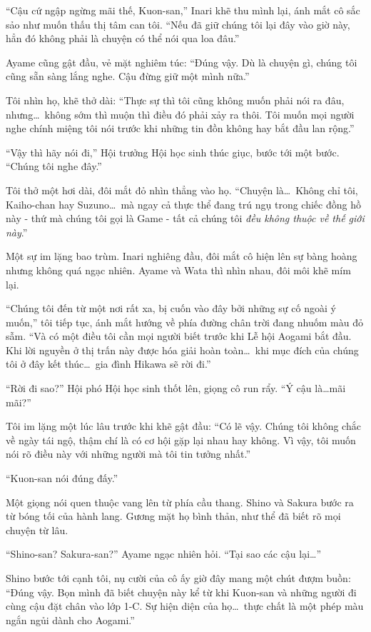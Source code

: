 \documentclass[../main.tex]{subfiles}
\begin{document}
``Cậu cứ ngập ngừng mãi thế, Kuon-san,'' Inari khẽ thu mình lại, ánh mắt cô sắc sảo như muốn thấu thị tâm can tôi. ``Nếu đã giữ chúng tôi lại đây vào giờ này, hẳn đó không phải là chuyện có thể nói qua loa đâu.''

Ayame cũng gật đầu, vẻ mặt nghiêm túc: ``Đúng vậy. Dù là chuyện gì, chúng tôi cũng sẵn sàng lắng nghe. Cậu đừng giữ một mình nữa.''

Tôi nhìn họ, khẽ thở dài: ``Thực sự thì tôi cũng không muốn phải nói ra đâu, nhưng\dots\ không sớm thì muộn thì điều đó phải xảy ra thôi. Tôi muốn mọi người nghe chính miệng tôi nói trước khi những tin đồn không hay bắt đầu lan rộng.''

``Vậy thì hãy nói đi,'' Hội trưởng Hội học sinh thúc giục, bước tới một bước. ``Chúng tôi nghe đây.''

Tôi thở một hơi dài, đôi mắt đỏ nhìn thẳng vào họ. ``Chuyện là\dots\ Không chỉ tôi, Kaiho-chan hay Suzuno\dots\ mà ngay cả thực thể đang trú ngụ trong chiếc đồng hồ này - thứ mà chúng tôi gọi là Game - tất cả chúng tôi \emph{đều không thuộc về thế giới này}.''

Một sự im lặng bao trùm. Inari nghiêng đầu, đôi mắt cô hiện lên sự bàng hoàng nhưng không quá ngạc nhiên. Ayame và Wata thì nhìn nhau, đôi môi khẽ mím lại.

``Chúng tôi đến từ một nơi rất xa, bị cuốn vào đây bởi những sự cố ngoài ý muốn,'' tôi tiếp tục, ánh mắt hướng về phía đường chân trời đang nhuốm màu đỏ sẫm. ``Và có một điều tôi cần mọi người biết trước khi Lễ hội Aogami bắt đầu. Khi lời nguyền ở thị trấn này được hóa giải hoàn toàn\dots\ khi mục đích của chúng tôi ở đây kết thúc\dots\ gia đình Hikawa sẽ rời đi.''

``Rời đi sao?'' Hội phó Hội học sinh thốt lên, giọng cô run rẩy. ``Ý cậu là\dots mãi mãi?''

Tôi im lặng một lúc lâu trước khi khẽ gật đầu: ``Có lẽ vậy. Chúng tôi không chắc về ngày tái ngộ, thậm chí là có cơ hội gặp lại nhau hay không. Vì vậy, tôi muốn nói rõ điều này với những người mà tôi tin tưởng nhất.''

``Kuon-san nói đúng đấy.''

Một giọng nói quen thuộc vang lên từ phía cầu thang. Shino và Sakura bước ra từ bóng tối của hành lang. Gương mặt họ bình thản, như thể đã biết rõ mọi chuyện từ lâu.

``Shino-san? Sakura-san?'' Ayame ngạc nhiên hỏi. ``Tại sao các cậu lại\dots''

Shino bước tới cạnh tôi, nụ cười của cô ấy giờ đây mang một chút đượm buồn: ``Đúng vậy. Bọn mình đã biết chuyện này kể từ khi Kuon-san và những người đi cùng cậu đặt chân vào lớp 1-C. Sự hiện diện của họ\dots\ thực chất là một phép màu ngắn ngủi dành cho Aogami.''
\end{document}
